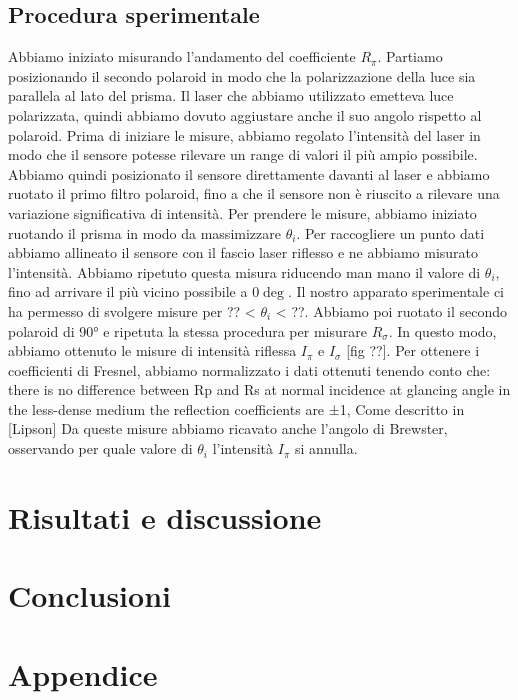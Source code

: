 \documentclass[12pt, a4paper, twoside]{article}
\begin{document}
  \subsection{Procedura sperimentale}\label{subsec:procedura-sperimentale}
    Abbiamo iniziato misurando l’andamento del coefficiente $R_\pi$. Partiamo posizionando il secondo polaroid in modo che la polarizzazione della luce sia parallela al lato del prisma. Il laser che abbiamo utilizzato emetteva luce polarizzata, quindi abbiamo dovuto aggiustare anche il suo angolo rispetto al polaroid. Prima di iniziare le misure, abbiamo regolato l’intensità del laser in modo che il sensore potesse rilevare un range di valori il più ampio possibile. Abbiamo quindi posizionato il sensore direttamente davanti al laser e abbiamo ruotato il primo filtro polaroid, fino a che il sensore non è riuscito a rilevare una variazione significativa di intensità.
    Per prendere le misure, abbiamo iniziato ruotando il prisma in modo da massimizzare $\theta_i$. Per raccogliere un
    punto dati abbiamo allineato il sensore con il fascio laser riflesso e ne abbiamo misurato l’intensità. Abbiamo
    ripetuto questa misura riducendo man mano il valore di $\theta_i$, fino ad arrivare il più vicino possibile a $0\deg$.
    Il nostro apparato sperimentale ci ha permesso di svolgere misure per ?? < $\theta_i$ < ??.
    Abbiamo poi ruotato il secondo polaroid di 90° e ripetuta la stessa procedura per misurare $R_\sigma$.
    In questo modo, abbiamo ottenuto le misure di intensità riflessa $I_\pi$ e $I_\sigma$ [fig ??]. Per ottenere i
    coefficienti di Fresnel, abbiamo normalizzato i dati ottenuti tenendo conto che:
    there is no difference between Rp and Rs at normal incidence
    at glancing angle in the less-dense medium the reflection coefficients are ±1,
    Come descritto in [Lipson]
    Da queste misure abbiamo ricavato anche l’angolo di Brewster, osservando per quale valore di $\theta_i$
    l’intensità $I_\pi$ si annulla.


\section{Risultati e discussione}\label{sec:risultati-e-discussione}
  \blindtext[2]

\section{Conclusioni}\label{sec:conclusioni}
  \blindtext[1]

\newpage
\section{Appendice}
\end{document}
